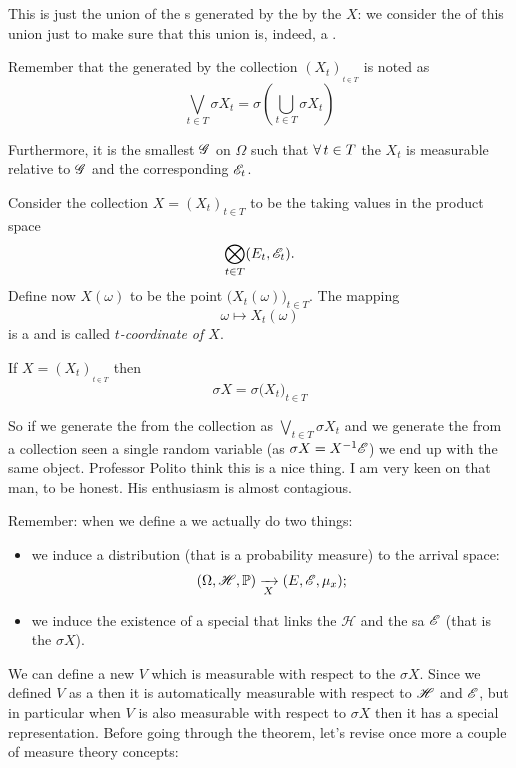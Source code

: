 \documentclass{report}
\begin{document}
This is just the union of the \sa s generated by the by the \rv{} $X$: we consider the \sa{} of this union just to make sure that this union is, indeed, a \sa{}.\par
\begin{notation}
	Remember that the \sa{} generated by the collection $(X_t)_{_{t\in T}}$ is noted as
		\[\bigvee_{t\in T}\sigma X_t=\sigma\left(\bigcup_{t\in T}\sigma X_t\right)\]
\end{notation}
Furthermore, it is the smallest \sa{} $\mathscr{G}$ on $\Omega$ such that $\forall\, t\in T$ the \rv{} $X_t$ is measurable relative to $\mathscr{G}$ and the corresponding $\mathscr{E}_t$.
\begin{remark}
	Consider the collection $X={(X_{t})}_{t\in T}$ to be the \rv{} taking values in the product space 
	\[\bigotimes_{t\in T}(E_t,\mathscr{E}_t).\]
	Define now $X(\omega)$ to be the point $\Big(X_t(\omega)\Big)_{t\in T}$. The mapping 
	\[\omega\mapsto X_t(\omega)\]
	is a \rv{} and is called \emph{$t$-coordinate of $X$}.
\end{remark}
\begin{proposition}
	If $X=(X_{t})_{_{t\in T}}$ then $$\sigma X=\sigma{\Big(X_{t}\Big)}_{t\in T}$$
\end{proposition}
So if we generate the \sa{} from the collection as $\bigvee_{t\in T}\sigma X_t$ and we generate the \sa{} from a collection seen a single random variable (as $\sigma X=X^{-1}\mathscr{E}$) we end up with the same object. Professor Polito think this is a nice thing. I am very keen on that man, to be honest. His enthusiasm is almost contagious.\par
Remember: when we define a \rv{} we actually do two things:
\begin{itemize}
	\item we induce a distribution (that is a probability measure) to the arrival space:
	\[(\Omega,\mathscr{H},\mathbb{P})\xrightarrow[X]{}(E,\mathscr{E},\mu_x);\]
	\item we induce the existence of a special \sa{} that links the \sa{} $\mathscr{H}$ and the sa $\mathscr{E}$ (that is the \sa{} $\sigma X$).
\end{itemize}
We can define a new \rv{} $V$ which is measurable with respect to the \sa{} $\sigma X$. Since we defined $V$ as a \rv{} then it is automatically measurable with respect to $\mathscr{H}$ and $\mathscr{E}$, but in particular when $V$ is also measurable with respect to $\sigma X$ then it has a special representation. Before going through the theorem, let's revise once more a couple of measure theory concepts:
\end{document}
